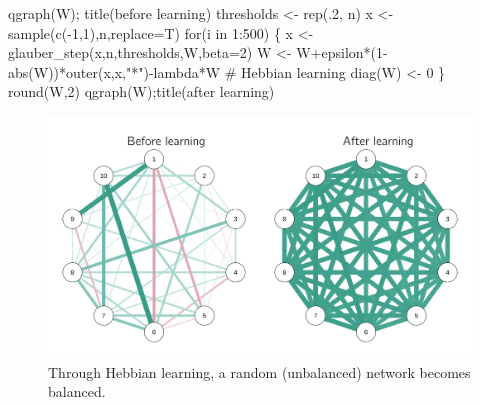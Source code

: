 \documentclass[
  a4paper,
  DIV=11,
  numbers=noendperiod,
  oneside]{scrreprt}
\newenvironment{Shaded}{\begin{snugshade}}{\end{snugshade}}
\newcommand{\AttributeTok}[1]{\textcolor[rgb]{0.40,0.45,0.13}{#1}}
\newcommand{\CommentTok}[1]{\textcolor[rgb]{0.37,0.37,0.37}{#1}}
\newcommand{\ControlFlowTok}[1]{\textcolor[rgb]{0.00,0.23,0.31}{#1}}
\newcommand{\DecValTok}[1]{\textcolor[rgb]{0.68,0.00,0.00}{#1}}
\newcommand{\FunctionTok}[1]{\textcolor[rgb]{0.28,0.35,0.67}{#1}}
\newcommand{\NormalTok}[1]{\textcolor[rgb]{0.00,0.23,0.31}{#1}}
\newcommand{\OtherTok}[1]{\textcolor[rgb]{0.00,0.23,0.31}{#1}}
\newcommand{\SpecialCharTok}[1]{\textcolor[rgb]{0.37,0.37,0.37}{#1}}
\newcommand{\StringTok}[1]{\textcolor[rgb]{0.13,0.47,0.30}{#1}}
\begin{document}
\begin{Shaded}
\begin{Highlighting}[]
\FunctionTok{qgraph}\NormalTok{(W); }\FunctionTok{title}\NormalTok{(}\StringTok{\textquotesingle{}before learning\textquotesingle{}}\NormalTok{)}
\NormalTok{thresholds }\OtherTok{\textless{}{-}} \FunctionTok{rep}\NormalTok{(.}\DecValTok{2}\NormalTok{, n)}
\NormalTok{x }\OtherTok{\textless{}{-}} \FunctionTok{sample}\NormalTok{(}\FunctionTok{c}\NormalTok{(}\SpecialCharTok{{-}}\DecValTok{1}\NormalTok{,}\DecValTok{1}\NormalTok{),n,}\AttributeTok{replace=}\NormalTok{T)}
\ControlFlowTok{for}\NormalTok{(i }\ControlFlowTok{in} \DecValTok{1}\SpecialCharTok{:}\DecValTok{500}\NormalTok{)}
\NormalTok{\{}
\NormalTok{x }\OtherTok{\textless{}{-}} \FunctionTok{glauber\_step}\NormalTok{(x,n,thresholds,W,}\AttributeTok{beta=}\DecValTok{2}\NormalTok{)}
\NormalTok{W }\OtherTok{\textless{}{-}}\NormalTok{ W}\SpecialCharTok{+}\NormalTok{epsilon}\SpecialCharTok{*}\NormalTok{(}\DecValTok{1}\SpecialCharTok{{-}}\FunctionTok{abs}\NormalTok{(W))}\SpecialCharTok{*}\FunctionTok{outer}\NormalTok{(x,x,}\StringTok{"*"}\NormalTok{)}\SpecialCharTok{{-}}\NormalTok{lambda}\SpecialCharTok{*}\NormalTok{W }\CommentTok{\# Hebbian learning}
\FunctionTok{diag}\NormalTok{(W) }\OtherTok{\textless{}{-}} \DecValTok{0}
\NormalTok{\}}
\FunctionTok{round}\NormalTok{(W,}\DecValTok{2}\NormalTok{)}
\FunctionTok{qgraph}\NormalTok{(W);}\FunctionTok{title}\NormalTok{(}\StringTok{\textquotesingle{}after learning\textquotesingle{}}\NormalTok{)}
\end{Highlighting}
\end{Shaded}

\begin{figure}

{\centering \includegraphics{media/ch6/fig-ch6-img14-old-83.png}

}

\caption{\label{fig-ch6-img14-old-83}Through Hebbian learning, a random
(unbalanced) network becomes balanced.}

\end{figure}
\end{document}
